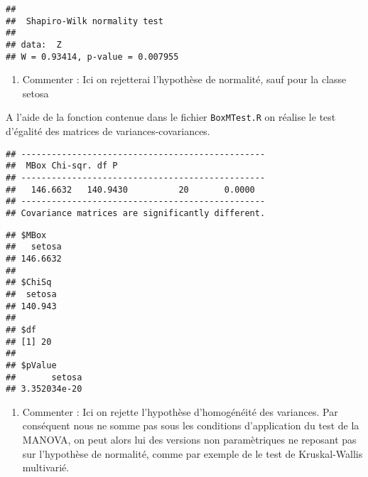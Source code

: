 \documentclass[
]{article}
\newenvironment{Shaded}{\begin{snugshade}}{\end{snugshade}}
\newcommand{\CommentTok}[1]{\textcolor[rgb]{0.56,0.35,0.01}{\textit{#1}}}
\newcommand{\DecValTok}[1]{\textcolor[rgb]{0.00,0.00,0.81}{#1}}
\newcommand{\KeywordTok}[1]{\textcolor[rgb]{0.13,0.29,0.53}{\textbf{#1}}}
\newcommand{\NormalTok}[1]{#1}
\newcommand{\OperatorTok}[1]{\textcolor[rgb]{0.81,0.36,0.00}{\textbf{#1}}}
\newcommand{\StringTok}[1]{\textcolor[rgb]{0.31,0.60,0.02}{#1}}
\providecommand{\tightlist}{%
  \setlength{\itemsep}{0pt}\setlength{\parskip}{0pt}}
\begin{document}
\begin{verbatim}
## 
##  Shapiro-Wilk normality test
## 
## data:  Z
## W = 0.93414, p-value = 0.007955
\end{verbatim}

\begin{enumerate}
\def\labelenumi{\arabic{enumi}.}
\setcounter{enumi}{9}
\tightlist
\item
  Commenter : Ici on rejetterai l'hypothèse de normalité, sauf pour la
  classe setosa
\end{enumerate}

A l'aide de la fonction contenue dans le fichier \texttt{BoxMTest.R} on
réalise le test d'égalité des matrices de variances-covariances.

\begin{Shaded}
\end{Shaded}

\begin{verbatim}
## ------------------------------------------------
##  MBox Chi-sqr. df P
## ------------------------------------------------
##   146.6632   140.9430          20       0.0000
## ------------------------------------------------
## Covariance matrices are significantly different.
\end{verbatim}

\begin{verbatim}
## $MBox
##   setosa 
## 146.6632 
## 
## $ChiSq
##  setosa 
## 140.943 
## 
## $df
## [1] 20
## 
## $pValue
##       setosa 
## 3.352034e-20
\end{verbatim}

\begin{enumerate}
\def\labelenumi{\arabic{enumi}.}
\setcounter{enumi}{10}
\tightlist
\item
  Commenter : Ici on rejette l'hypothèse d'homogénéité des variances.
  Par conséquent nous ne somme pas sous les conditions d'application du
  test de la MANOVA, on peut alors lui des versions non paramètriques ne
  reposant pas sur l'hypothèse de normalité, comme par exemple de le
  test de Kruskal-Wallis multivarié.
\end{enumerate}
\end{document}

